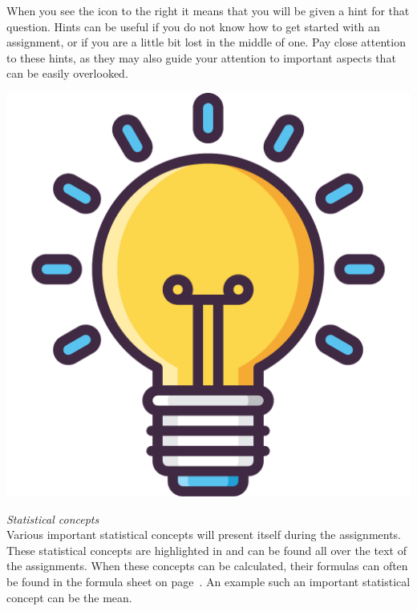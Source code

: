 \begin{minipage}{0.85\textwidth}
When you see the icon to the right it means that you will be given a hint for that question. Hints can be useful if you do not know how to get started with an assignment, or if you are a little bit lost in the middle of one. Pay close attention to these hints, as they may also guide your attention to important aspects that can be easily overlooked.
\end{minipage}%
\hfill%
\begin{minipage}{0.1\textwidth}
\includegraphics[width=\linewidth]{Files/Images/lightbulb.pdf}
\end{minipage}

\clearpage

\textit{Statistical concepts} \\ 

Various important statistical concepts will present itself during the assignments. These statistical concepts are highlighted in  and can be found all over the text of the assignments. When these concepts can be calculated, their formulas can often be found in the formula sheet on page~\pageref{formulasheet}. An example such an important statistical concept can be the mean. \\

 \\ 

